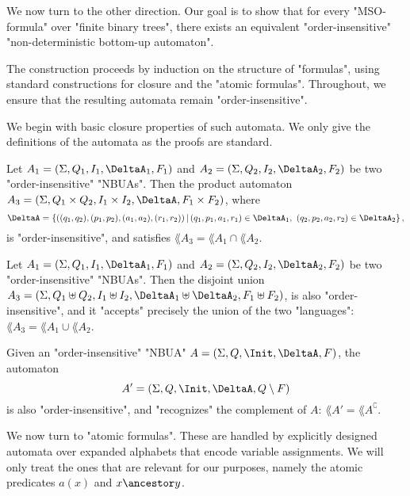 \documentclass[a4paper,UKenglish,cleveref, autoref, thm-restate]{lipics-v2021}
\begin{document}
We now turn to the other direction. Our goal is to show that for every "MSO-formula" over "finite binary trees",
there exists an equivalent "order-insensitive" "non-deterministic bottom-up automaton".

The construction proceeds by induction on the structure of "formulas", using standard constructions for closure and the "atomic formulas".
Throughout, we ensure that the resulting automata remain "order-insensitive".

We begin with basic closure properties of such automata. We only give the definitions of the automata as the proofs are standard.

\begin{lemma}[intersection]\label{lem:intersection}
	Let $A_1 = (\Sigma, Q_1, I_1, \DeltaA_1, F_1)$ and $A_2 = (\Sigma, Q_2, I_2, \DeltaA_2, F_2)$ be two "order-insensitive" "NBUAs". Then the product automaton
	$A_3 = (\Sigma, Q_1 \times Q_2, I_1 \times I_2, \DeltaA, F_1 \times F_2)$, where
	\[
		\DeltaA = \left\{ ((q_1,q_2), (p_1,p_2), (a_1,a_2), (r_1,r_2)) \,\middle|\, (q_1,p_1,a_1,r_1) \in \DeltaA_1,\ (q_2,p_2,a_2,r_2) \in \DeltaA_2 \right\},
	\]
	is "order-insensitive", and satisfies $\lang{A_3} = \lang{A_1} \cap \lang{A_2}$.
\end{lemma}

\begin{lemma}[union]\label{lem:union}
	Let $A_1 = (\Sigma, Q_1, I_1, \DeltaA_1, F_1)$ and $A_2 = (\Sigma, Q_2, I_2, \DeltaA_2, F_2)$ be two "order-insensitive" "NBUAs". Then the disjoint union
	$A_3 = (\Sigma, Q_1 \uplus Q_2, I_1 \uplus I_2, \DeltaA_1 \uplus \DeltaA_2, F_1 \uplus F_2)$,
	is also "order-insensitive", and it "accepts" precisely the union of the two "languages": $\lang{A_3} = \lang{A_1} \cup \lang{A_2}$.
\end{lemma}

\begin{lemma}[complement]\label{lem:complement}
	Given an "order-insensitive" "NBUA" $A = (\Sigma, Q, \Init, \DeltaA, F)$, the automaton
	\[
		A' = (\Sigma, Q, \Init, \DeltaA, Q \setminus F)
	\]
	is also "order-insensitive", and "recognizes" the complement of $A$: $\lang{A'} = \lang{A}^\complement$.
\end{lemma}

We now turn to "atomic formulas". These are handled by explicitly designed automata over expanded alphabets that encode variable assignments.
We will only treat the ones that are relevant for our purposes, namely the atomic predicates $a(x)$ and $x \ancestor y$.
\end{document}
